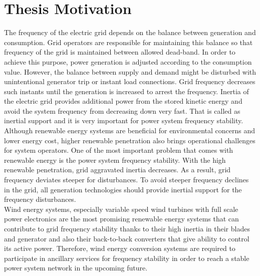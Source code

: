 \section{Thesis Motivation}
The frequency of the electric grid depends on the balance between generation and consumption. Grid operators are responsible for maintaining this balance so that frequency of the grid is maintained between allowed dead-band. In order to achieve this purpose, power generation is adjusted according to the consumption value. However, the balance between supply and demand might be disturbed with unintentional generator trip or instant load connections. Grid frequency decreases such instants until the generation is increased to arrest the frequency. Inertia of the electric grid provides additional power from the stored kinetic energy and avoid the system frequency from decreasing down very fast. That is called as inertial support and it is very important for power system frequency stability.\\
Although renewable energy systems are beneficial for environmental concerns and lower energy cost, higher renewable penetration also brings operational challenges for system operators. One of the most important problem that comes with renewable energy is the power system frequency stability. With the high renewable penetration, grid aggravated inertia decreases. As a result, grid frequency deviates steeper for disturbances. To avoid steeper frequency declines in the grid, all generation technologies should provide inertial support for the frequency disturbances.\\
Wind energy systems, especially variable speed wind turbines with full scale power electronics are the most promising renewable energy systems that can contribute to grid frequency stability thanks to their high inertia in their blades and generator and also their back-to-back converters that give ability to control its active power. Therefore, wind energy conversion systems are required to participate in ancillary services for frequency stability in order to reach a stable power system network in the upcoming future. 

